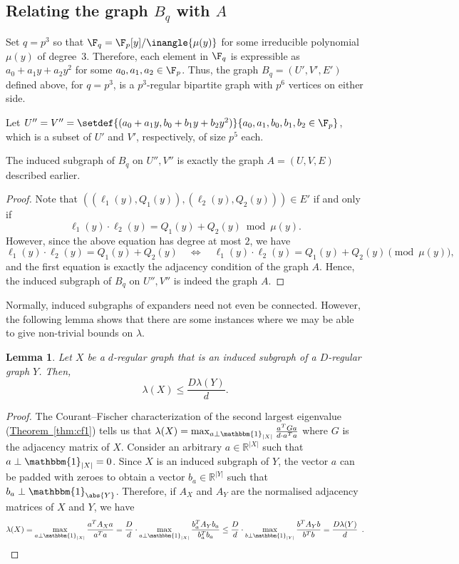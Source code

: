 \documentclass[11pt]{article}
\newcommand{\expref}[2]{\texorpdfstring{\hyperref[#2]{#1~\ref{#2}}}{#1~\ref{#2}}}
\newtheorem{lemma}[theorem]{Lemma}
\newcommand{\R}{{\mathbb R}}
\begin{document}
\subsection{Relating the graph $B_q$ with $A$}

Set $q = p^3$ so that %
$\F_q = \F_p[y]/\inangle{\mu(y)}$ %
for some irreducible polynomial $\mu(y)$ of %
%
degree~3.  %
Therefore, each
element in $\F_q$ is expressible as $a_0 + a_1y + a_2 y^2$ for some
$a_0,a_1,a_2\in \F_p$. Thus, the graph $B_q=(U',V',E')$ defined above,
for %
$q = p^3$, is a $p^3$-regular bipartite graph with $p^6$ vertices on either side.

Let $U'' = V'' = \setdef{(a_0 + a_1y , b_0 + b_1y + b_2 y^2)}{a_0,a_1,b_0,b_1,b_2 \in \F_p}$, which is a subset of $U'$ and $V'$, respectively, of size $p^5$ each.

\begin{observation}
  The induced subgraph of $B_q$ on  $U'',V''$ is exactly the graph
  $A=(U,V,E)$ described earlier. 
\end{observation}
\begin{proof}
  Note that $((\ell_1(y),Q_1(y)),(\ell_2(y),Q_2(y))) \in E'$ if and only if
  \[
    \ell_1(y)\cdot \ell_2(y) = Q_1(y) + Q_2(y) \bmod{\mu(y)}. 
  \]
  However, since the above equation has degree at most $2$, we have
  \[
    \ell_1(y)\cdot \ell_2(y) = Q_1(y) + Q_2(y) \quad\Leftrightarrow\quad \ell_1(y)\cdot \ell_2(y) = Q_1(y) + Q_2(y) \pmod{\mu(y)},
  \]
  and the first equation is exactly the adjacency condition of the graph $A$. Hence, the induced subgraph of $B_q$ on $U'',V''$ is indeed the graph $A$. 
\end{proof}

Normally, induced subgraphs of expanders need not even be connected. However, the following lemma shows that there are some instances where we may be able to give non-trivial bounds on $\lambda$.

\begin{lemma}\label{lem:induced-subgraph-eig-bound}
%
Let $X$ be  %
a $d$-regular %
graph that is an induced subgraph of a $D$-regular graph $Y$. Then,
  \[
    \lambda(X) \leq \frac{D \lambda(Y)}{d}. 
  \]
\end{lemma}
\begin{proof} The %
  Courant--Fischer  %
  characterization of the second largest eigenvalue
  (\expref{Theorem}{thm:cf1})  %
tells us that \(\lambda(X) = \max_{a \perp \mathbbm{1}_{|X|}} \frac{a^T G a}{d \cdot a^T a}\) where $G$ is the adjacency matrix of $X$.
 Consider an arbitrary $a \in \R^{|X|}$ such that $a \perp \mathbbm{1}_{|X|} = 0$. Since $X$ is an induced subgraph of $Y$, the vector $a$ can be padded with zeroes to obtain a vector $b_a \in \R^{|Y|}$ such that $b_a \perp \mathbbm{1}_{\abs{Y}}$. Therefore, if $A_X$ and $A_Y$ are the normalised adjacency matrices of $X$ and $Y$, we have
\[
   \lambda(X) = \max_{a \perp \mathbbm{1}_{|X|}} \frac{a^T A_X
   a}{a^T a} =  \frac{D}{d}\cdot \max_{a \perp \mathbbm{1}_{|X|}}
   \frac{b_a^T A_Y b_a}{b_a^T b_a}
   \leq \frac{D}{d}\cdot \max_{b \perp \mathbbm{1}_{|Y|}}
   \frac{b^T A_Y b}{b^T b} =
   \frac{D\lambda(Y)}{d} \enspace . \qedhere
 \]
\end{proof}
\end{document}

